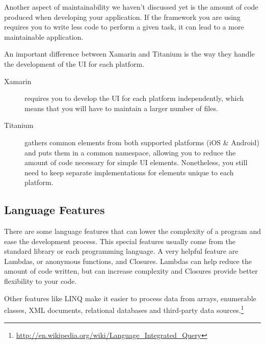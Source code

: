 Another aspect of maintainability we haven't discussed yet is the amount of code produced when developing your application. If the framework you are using requires you to write less code to perform a given task, it can lead to a more maintainable application.

An important difference between Xamarin and Titanium is the way they handle the development of the \ac{UI} for each platform.

\begin{description}
\item[Xamarin] requires you to develop the \ac{UI} for each platform independently, which means that you will have to maintain a larger number of files.
\item[Titanium] gathers common elements from both supported platforms (iOS \& Android) and puts them in a common namespace, allowing you to reduce the amount of code necessary for simple \ac{UI} elements. Nonetheless, you still need to keep separate implementations for elements unique to each platform.
\end{description}
\vfill


\subsection{Language Features}

There are some language features that can lower the complexity of a program and ease the development process. This special features usually come from the standard library or each programming language. A very helpful feature are Lambdas, or anonymous functions, and Closures. Lambdas can help reduce the amount of code written, but can increase complexity and Closures provide better flexibility to your code.

Other features like \ac{LINQ} make it easier to process data from arrays, enumerable classes, XML documents, relational databases and third-party data sources.\footnote{\url{http://en.wikipedia.org/wiki/Language_Integrated_Query}} 

